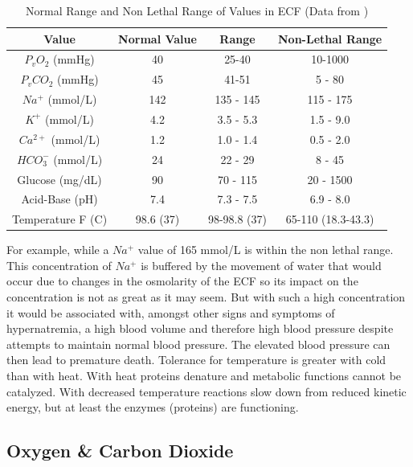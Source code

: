 \begin{table}[h!]
\centering
\begin{tabular}{||c c c c||} 
 \hline
Value & Normal Value & Range & Non-Lethal Range\\ [0.5ex] 
 \hline\hline
 $P_v O_2$ (mmHg) & 40  & 25-40 & 10-1000 \\
 $P_v CO_2$ (mmHg) & 45 & 41-51 & 5 - 80\\ 
 $Na^+$ (mmol/L) & 142 & 135 - 145 & 115 - 175\\
 $K^+$  (mmol/L) & 4.2 & 3.5 - 5.3 & 1.5 - 9.0\\ 
 $Ca^{2+}$ (mmol/L) & 1.2 & 1.0 - 1.4 & 0.5 - 2.0 \\
 $HCO_3 ^-$ (mmol/L)& 24 & 22 - 29 & 8 - 45 \\
 Glucose (mg/dL)& 90 & 70 - 115 & 20 - 1500 \\
 Acid-Base (pH) & 7.4 & 7.3 - 7.5 & 6.9 - 8.0 \\
 Temperature F (C) & 98.6 (37) & 98-98.8 (37) & 65-110 (18.3-43.3)\\[1ex] 
 \hline
\end{tabular}
\caption{Normal Range and Non Lethal Range of Values in ECF (\footnotesize{Data from \cite{feher_quantitative_2017}})}
\label{table:ecf_value_ranges}
\end{table}

For example, while a $Na^+$ value of 165 mmol/L is within the non lethal range. This concentration of $Na^+$ is buffered by the movement of water that would occur due to changes in the osmolarity of the ECF so its impact on the concentration is not as great as it may seem. But with such a high concentration it would be associated with, amongst other signs and symptoms of hypernatremia, a high blood volume and therefore high blood pressure despite attempts to maintain normal blood pressure. The elevated blood pressure can then lead to premature death.  Tolerance for temperature is greater with cold than with heat. With heat proteins denature and metabolic functions cannot be catalyzed. With decreased temperature reactions slow down from reduced kinetic energy, but at least the enzymes (proteins) are functioning. 


\subsection{Oxygen \& Carbon Dioxide}

